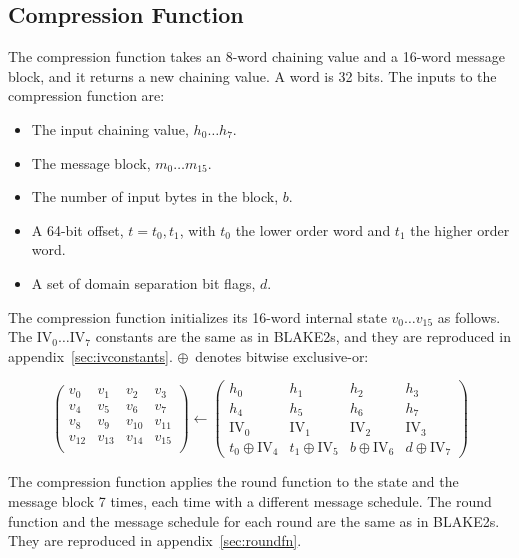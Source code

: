 \documentclass[11pt,notitlepage,a4paper]{article}
\newcommand{\IV}{\text{IV}}
\begin{document}
\subsection{Compression Function}\label{sec:compression}

The compression function takes an 8-word chaining value and a 16-word message
block, and it returns a new chaining value. A word is 32 bits. The inputs to
the compression function are:

\begin{itemize}
    \item The input chaining value, $h_{0} \ldots h_{7}$.
    \item The message block, $m_{0} \ldots m_{15}$.
    \item The number of input bytes in the block, $b$.
    \item A 64-bit offset, $t=t_{0},t_{1}$, with $t_{0}$ the lower order word
        and $t_{1}$ the higher order word.
    \item A set of domain separation bit flags, $d$.
\end{itemize}

The compression function initializes its 16-word internal state $v_{0} \ldots
v_{15}$ as follows. The $\IV_{0} \ldots \IV_{7}$ constants are the same as in
BLAKE2s, and they are reproduced in appendix~\ref{sec:ivconstants}.
$\oplus$~denotes bitwise exclusive-or:

\begin{equation*}
\begin{pmatrix}
v_{0} & v_{1} & v_{2} & v_{3} \\
v_{4} & v_{5} & v_{6} & v_{7} \\
v_{8} & v_{9} & v_{10} & v_{11} \\
v_{12} & v_{13} & v_{14} & v_{15} \\
\end{pmatrix}
\leftarrow
\begin{pmatrix}
h_{0} & h_{1} & h_{2} & h_{3} \\
h_{4} & h_{5} & h_{6} & h_{7} \\
\IV_{0} & \IV_{1} & \IV_{2} & \IV_{3} \\
t_{0} \oplus \IV_{4} & t_{1} \oplus \IV_{5} & b \oplus \IV_{6} & d \oplus \IV_{7}
\end{pmatrix}
\end{equation*}

The compression function applies the round function to the state and the
message block 7 times, each time with a different message schedule. The round
function and the message schedule for each round are the same as in BLAKE2s.
They are reproduced in appendix~\ref{sec:roundfn}.
\end{document}
